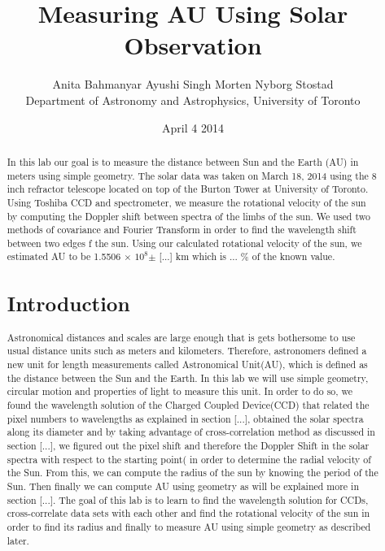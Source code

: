 \documentclass[letterpaper,12pt]{article}
\title{Measuring AU Using Solar Observation}
\author{Anita Bahmanyar \qquad Ayushi Singh \qquad Morten Nyborg Stostad \\Department of Astronomy and Astrophysics, University of Toronto}
\affil{\small {Written by: Anita Bahmanyar}}
\affil{\small {anita.bahmanyar@mail.utoronto.ca}}
\affil{\small {Student Number: 998909098}}
\date{April 4 2014}
\begin{document}
\maketitle

\begin{abstract}
\label{abstract}
In this lab our goal is to measure the distance between Sun and the Earth (AU) in meters using simple geometry. The solar data was taken on March 18, 2014 using the 8 inch refractor telescope located on top of the Burton Tower at University of Toronto. Using Toshiba CCD and spectrometer, we measure the rotational velocity of the sun by computing the Doppler shift between spectra of the limbs of the sun. We used two methods of covariance and Fourier Transform in order to find the wavelength shift between two edges f the sun. Using our calculated rotational velocity of the sun, we estimated AU to be 1.5506 $\times$ $10^{8}$$\pm$ [...] km which is ... \% of the known value.

\section{Introduction}
\label{sec:introduction}
Astronomical distances and scales are large enough that is gets bothersome to use usual distance units such as meters and kilometers. Therefore, astronomers defined a new unit for length measurements called Astronomical Unit(AU), which is defined as the distance between the Sun and the Earth. In this lab we will use simple geometry, circular motion and properties of light to measure this unit. In order to do so, we found the wavelength solution of the Charged Coupled Device(CCD) that related the pixel numbers to wavelengths as explained in section [...], obtained the solar spectra along its diameter and by taking advantage of cross-correlation method as discussed in section [...], we figured out the pixel shift and therefore the Doppler Shift in the solar spectra with respect to the starting point( in order to determine the radial velocity of the Sun. From this, we can compute the radius of the sun by knowing the period of the Sun. Then finally we can compute AU using geometry as will be explained more in section [...]. The goal of this lab is to learn to find the wavelength solution for CCDs, cross-correlate data sets with each other and find the rotational velocity of the sun in order to find its radius and finally to measure AU using simple geometry as described later.



\end{abstract}
\end{document}
